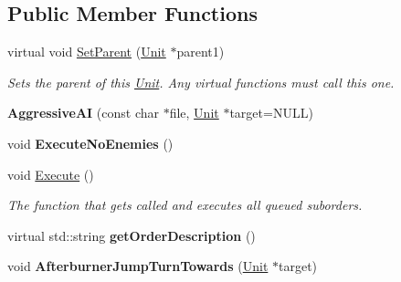 \subsection*{Public Member Functions}
\begin{DoxyCompactItemize}
\item 
virtual void \hyperlink{classOrders_1_1AggressiveAI_a716fd752f7351f2bd2fbf828f4dc7786}{Set\+Parent} (\hyperlink{classUnit}{Unit} $\ast$parent1)\hypertarget{classOrders_1_1AggressiveAI_a716fd752f7351f2bd2fbf828f4dc7786}{}\label{classOrders_1_1AggressiveAI_a716fd752f7351f2bd2fbf828f4dc7786}

\begin{DoxyCompactList}\small\item\em Sets the parent of this \hyperlink{classUnit}{Unit}. Any virtual functions must call this one. \end{DoxyCompactList}\item 
{\bfseries Aggressive\+AI} (const char $\ast$file, \hyperlink{classUnit}{Unit} $\ast$target=N\+U\+LL)\hypertarget{classOrders_1_1AggressiveAI_af3121df3e26792ffceb86bba943de6d0}{}\label{classOrders_1_1AggressiveAI_af3121df3e26792ffceb86bba943de6d0}

\item 
void {\bfseries Execute\+No\+Enemies} ()\hypertarget{classOrders_1_1AggressiveAI_a7ffa5fc92dabcf07e15f0415ef0c46c1}{}\label{classOrders_1_1AggressiveAI_a7ffa5fc92dabcf07e15f0415ef0c46c1}

\item 
void \hyperlink{classOrders_1_1AggressiveAI_abefcea3c9bea565eb545c8d9b68c7705}{Execute} ()\hypertarget{classOrders_1_1AggressiveAI_abefcea3c9bea565eb545c8d9b68c7705}{}\label{classOrders_1_1AggressiveAI_abefcea3c9bea565eb545c8d9b68c7705}

\begin{DoxyCompactList}\small\item\em The function that gets called and executes all queued suborders. \end{DoxyCompactList}\item 
virtual std\+::string {\bfseries get\+Order\+Description} ()\hypertarget{classOrders_1_1AggressiveAI_a0ee88dbeca94d27d953ef86795095ec6}{}\label{classOrders_1_1AggressiveAI_a0ee88dbeca94d27d953ef86795095ec6}

\item 
void {\bfseries Afterburner\+Jump\+Turn\+Towards} (\hyperlink{classUnit}{Unit} $\ast$target)\hypertarget{classOrders_1_1AggressiveAI_a295c3356f8167b3bbaeac67a808f60bc}{}\label{classOrders_1_1AggressiveAI_a295c3356f8167b3bbaeac67a808f60bc}

\end{DoxyCompactItemize}
